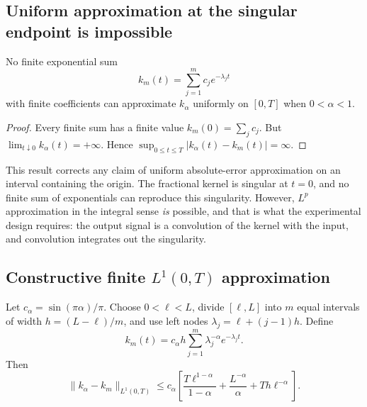 \subsection{Uniform approximation at the singular endpoint is impossible}

\begin{theorem}
\label{thm:T9a}
No finite exponential sum
\[
k_m(t) = \sum_{j=1}^m c_j e^{-\lambda_j t}
\]
with finite coefficients can approximate \(k_\alpha\) uniformly on \([0,T]\) when \(0 < \alpha < 1\).
\end{theorem}

\begin{proof}
Every finite sum has a finite value \(k_m(0) = \sum_j c_j\). But \(\lim_{t \downarrow 0} k_\alpha(t) = +\infty\). Hence \(\sup_{0 \le t \le T} |k_\alpha(t) - k_m(t)| = \infty\).
\end{proof}

This result corrects any claim of uniform absolute-error approximation on an interval containing the origin. The fractional kernel is singular at \(t=0\), and no finite sum of exponentials can reproduce this singularity. However, \(L^p\) approximation in the integral sense \emph{is} possible, and that is what the experimental design requires: the output signal is a convolution of the kernel with the input, and convolution integrates out the singularity.

\subsection{Constructive finite \(L^1(0,T)\) approximation}

\begin{theorem}
\label{thm:T9b}
Let \(c_\alpha = \sin(\pi\alpha)/\pi\). Choose \(0 < \ell < L\), divide \([\ell, L]\) into \(m\) equal intervals of width \(h = (L-\ell)/m\), and use left nodes \(\lambda_j = \ell + (j-1)h\). Define
\[
k_m(t) = c_\alpha h \sum_{j=1}^m \lambda_j^{-\alpha} e^{-\lambda_j t}.
\tag{3}
\]
Then
\[
\boxed{
\|k_\alpha - k_m\|_{L^1(0,T)}
\le c_\alpha \left[
\frac{T \ell^{1-\alpha}}{1-\alpha}
+ \frac{L^{-\alpha}}{\alpha}
+ T h \ell^{-\alpha}
\right].
}
\tag{4}
\]
\end{theorem}


